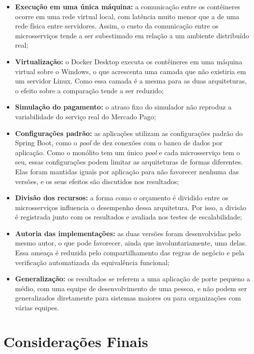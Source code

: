 \begin{itemize}
    \item \textbf{Execução em uma única máquina:} a comunicação entre os contêineres ocorre em
    uma rede virtual local, com latência muito menor que a de uma rede física entre
    servidores. Assim, o custo da comunicação entre os microsserviços tende a ser
    subestimado em relação a um ambiente distribuído real;
    \item \textbf{Virtualização:} o Docker Desktop executa os contêineres em uma máquina
    virtual sobre o Windows, o que acrescenta uma camada que não existiria em um servidor
    Linux. Como essa camada é a mesma para as duas arquiteturas, o efeito sobre a comparação
    tende a ser reduzido;
    \item \textbf{Simulação do pagamento:} o atraso fixo do simulador não reproduz a
    variabilidade do serviço real do Mercado Pago;
    \item \textbf{Configurações padrão:} as aplicações utilizam as configurações padrão do Spring
    Boot, como o \textit{pool} de dez conexões com o banco de dados por aplicação. Como o
    monólito tem um único \textit{pool} e cada microsserviço tem o seu, essas configurações
    podem limitar as arquiteturas de formas diferentes. Elas foram mantidas iguais por
    aplicação para não favorecer nenhuma das versões, e os seus efeitos são discutidos nos
    resultados;
    \item \textbf{Divisão dos recursos:} a forma como o orçamento é dividido entre os
    microsserviços influencia o desempenho dessa arquitetura. Por isso, a divisão é
    registrada junto com os resultados e avaliada nos testes de escalabilidade;
    \item \textbf{Autoria das implementações:} as duas versões foram desenvolvidas pelo mesmo
    autor, o que pode favorecer, ainda que involuntariamente, uma delas. Essa ameaça é
    reduzida pelo compartilhamento das regras de negócio e pela verificação automatizada da
    equivalência funcional;
    \item \textbf{Generalização:} os resultados se referem a uma aplicação de porte pequeno a
    médio, com uma equipe de desenvolvimento de uma pessoa, e não podem ser generalizados
    diretamente para sistemas maiores ou para organizações com várias equipes.
\end{itemize}

\section{Considerações Finais}

